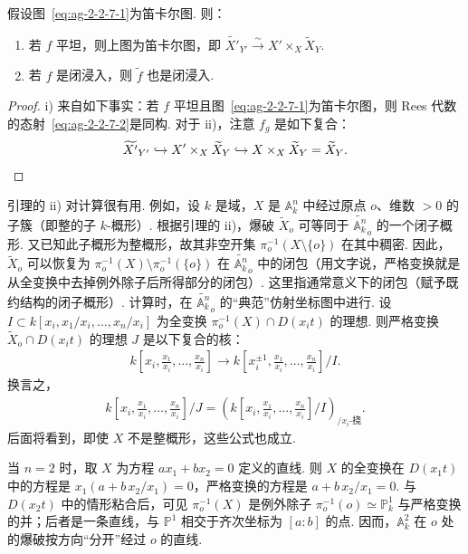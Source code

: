 \begin{lemma}\label{item:ag-2-2-8}
假设图~\eqref{eq:ag-2-2-7-1}为笛卡尔图. 则：
\begin{enumerate}[label=\roman*)]
\item 若 $f$ 平坦，则上图为笛卡尔图，即 $\widetilde{X'}_{Y'}\xrightarrow\sim X'\times_X\widetilde X_Y$.
\item 若 $f$ 是闭浸入，则 $\widetilde f$ 也是闭浸入.
\end{enumerate}
\end{lemma}
\begin{proof}
i) 来自如下事实：若 $f$ 平坦且图~\eqref{eq:ag-2-2-7-1}为笛卡尔图，则 Rees 代数的态射~\eqref{eq:ag-2-2-7-2}是同构. 对于 ii)，注意 $f_g$ 是如下复合：
\begin{align*}
\widetilde{X'}_{Y'}\hookrightarrow X'\times_X\widetilde X_Y\hookrightarrow X\times_X\widetilde X_Y=\widetilde X_Y.\qedhere
\end{align*}
\end{proof}
\begin{numpara}[应用]\label{item:ag-2-2-9}
引理的 ii) 对计算很有用. 例如，设 $k$ 是域，$X$ 是 $\mathbb A_k^n$ 中经过原点 $o$、维数 $>0$ 的子簇（即整的子 $k$-概形）. 根据引理的 ii)，爆破 $\widetilde X_o$ 可等同于 $\widetilde{\mathbb A_k^n}_o$ 的一个闭子概形. 又已知此子概形为整概形，故其非空开集 $\pi_o^{-1}(X\setminus\{o\})$ 在其中稠密. 因此，$\widetilde X_o$ 可以恢复为 $\pi_o^{-1}(X)\setminus\pi_o^{-1}(\{o\})$ 在 $\widetilde{\mathbb A_k^n}_o$ 中的闭包（用文字说，严格变换就是从全变换中去掉例外除子后所得部分的闭包）. 这里指通常意义下的闭包（赋予既约结构的闭子概形）. 计算时，在 $\widetilde{\mathbb A_k^n}_o$ 的``典范''仿射坐标图中进行. 设 $I\subset k[x_i,x_1/x_i,\ldots,x_n/x_i]$ 为全变换 $\pi_o^{-1}(X)\cap D(x_it)$ 的理想. 则严格变换 $\widetilde X_o\cap D(x_it)$ 的理想 $J$ 是以下复合的核：
\begin{align*}
k\left[x_i,\frac{x_1}{x_i},\ldots,\frac{x_n}{x_i}\right]\longrightarrow k\left[x_i^{\pm1},\frac{x_1}{x_i},\ldots,\frac{x_n}{x_i}\right]/I.
\end{align*}
换言之，
\begin{align*}
k\left[x_i,\frac{x_1}{x_i},\ldots,\frac{x_n}{x_i}\right]/J=\left(k\left[x_i,\frac{x_1}{x_i},\ldots,\frac{x_n}{x_i}\right]/I\right)_{/x_i\text{-挠}}.
\end{align*}
后面将看到，即使 $X$ 不是整概形，这些公式也成立.
\end{numpara}
\begin{example*}
当 $n=2$ 时，取 $X$ 为方程 $ax_1+bx_2=0$ 定义的直线. 则 $X$ 的全变换在 $D(x_1t)$ 中的方程是 $x_1(a+b\,x_2/x_1)=0$，严格变换的方程是 $a+b\,x_2/x_1=0$. 与 $D(x_2t)$ 中的情形粘合后，可见 $\pi_o^{-1}(X)$ 是例外除子 $\pi_o^{-1}(o)\simeq\mathbb P_k^1$ 与严格变换的并；后者是一条直线，与 $\mathbb P^1$ 相交于齐次坐标为 $[a:b]$ 的点. 因而，$\mathbb A_k^2$ 在 $o$ 处的爆破按方向``分开''经过 $o$ 的直线.
\end{example*}
